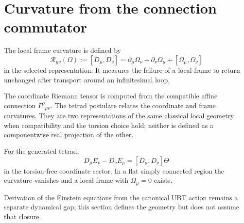 
\section{Curvature from the connection commutator}
\label{sec:canonical:curvature}

The local frame curvature is defined by
\[
 \mathcal R_{\mu\nu}(\Omega):=[D_\mu,D_\nu]
 =\partial_\mu\Omega_\nu-\partial_\nu\Omega_\mu
  +[\Omega_\mu,\Omega_\nu]
\]
in the selected representation.  It measures the failure of a local frame to
return unchanged after transport around an infinitesimal loop.

The coordinate Riemann tensor is computed from the compatible affine connection
$\Gamma^\rho{}_{\mu\nu}$.  The tetrad postulate relates the coordinate and
frame curvatures.  They are two representations of the same classical local
geometry when compatibility and the torsion choice hold; neither is defined as
a componentwise real projection of the other.

For the generated tetrad,
\[
 D_\mu E_\nu-D_\nu E_\mu=[D_\mu,D_\nu]\Theta
\]
in the torsion-free coordinate sector.  In a flat simply connected region the
curvature vanishes and a local frame with $\Omega_\mu=0$ exists.

Derivation of the Einstein equations from the canonical UBT action remains a
separate dynamical gap; this section defines the geometry but does not assume
that closure.
